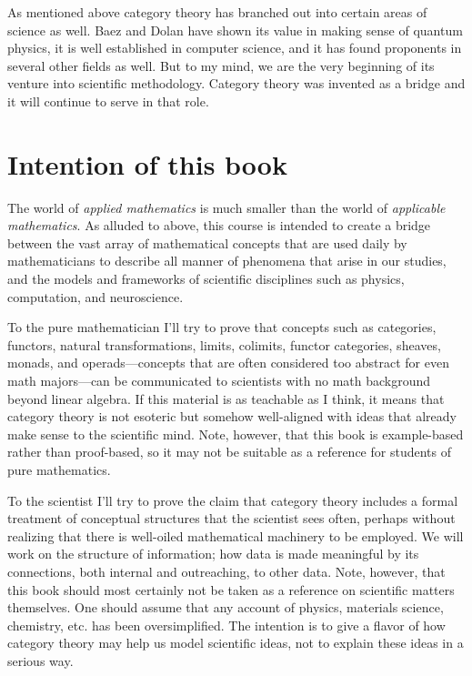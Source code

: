 \documentclass{book}
\theoremstyle{remark}
\theoremstyle{definition}
\begin{document}
As mentioned above category theory has branched out into certain areas of science as well. Baez and Dolan have shown its value in making sense of quantum physics, it is well established in computer science, and it has found proponents in several other fields as well. But to my mind, we are the very beginning of its venture into scientific methodology. Category theory was invented as a bridge and it will continue to serve in that role. 


\section{Intention of this book}

The world of {\em applied mathematics} is much smaller than the world of {\em applicable mathematics}. As alluded to above, this course is intended to create a bridge between the vast array of mathematical concepts that are used daily by mathematicians to describe all manner of phenomena that arise in our studies, and the models and frameworks of scientific disciplines such as physics, computation, and neuroscience. 

To the pure mathematician I'll try to prove that concepts such as categories, functors, natural transformations, limits, colimits, functor categories, sheaves, monads, and operads---concepts that are often considered too abstract for even math majors---can be communicated to scientists with no math background beyond linear algebra. If this material is as teachable as I think, it means that category theory is not esoteric but somehow well-aligned with ideas that already make sense to the scientific mind. Note, however, that this book is example-based rather than proof-based, so it may not be suitable as a reference for students of pure mathematics.

To the scientist I'll try to prove the claim that category theory includes a formal treatment of conceptual structures that the scientist sees often, perhaps without realizing that there is well-oiled mathematical machinery to be employed. We will work on the structure of information; how data is made meaningful by its connections, both internal and outreaching, to other data. Note, however, that this book should most certainly not be taken as a reference on scientific matters themselves. One should assume that any account of physics, materials science, chemistry, etc. has been oversimplified. The intention is to give a flavor of how category theory may help us model scientific ideas, not to explain these ideas in a serious way. 
\end{document}
